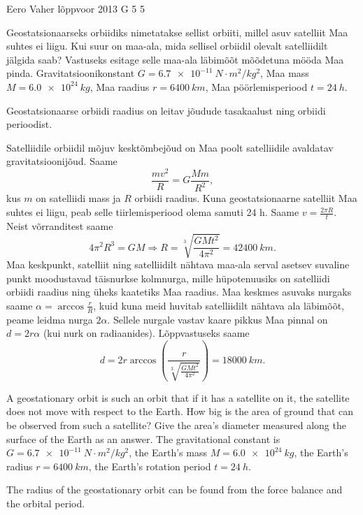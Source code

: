 {Eero Vaher} %
{lõppvoor} %
{2013} %
{G 5} %
{5} %
{
\ifStatement
Geostatsionaarseks orbiidiks nimetatakse sellist orbiiti, millel asuv satelliit
Maa suhtes ei liigu. Kui suur on maa-ala, mida sellisel orbiidil olevalt
satelliidilt jälgida saab? Vastuseks esitage selle maa-ala läbimõõt mõõdetuna
mööda Maa pinda. Gravitatsioonikonstant $G=\SI{6.7e-11}{N \cdot m^2/kg^2}$, Maa
mass $M=\SI{6,0e24}{kg}$, Maa raadius $r=\SI{6400}{km}$, Maa
pöörlemisperiood $t=\SI{24}{h}$.
\fi


\ifHint
Geostatsionaarse orbiidi raadius on leitav jõudude tasakaalust ning orbiidi perioodist.
\fi


\ifSolution
Satelliidile orbiidil mõjuv kesktõmbejõud on Maa poolt satelliidile avaldatav gravitatsioonijõud. Saame $$\frac{mv^2}{R}=G\frac{Mm}{R^2},$$kus $m$ on satelliidi mass ja $R$ orbiidi raadius. Kuna geostatsionaarne satelliit Maa suhtes ei liigu, peab selle tiirlemisperiood olema samuti 24 h. Saame $v=\frac{2\pi R}{t}$. Neist võrranditest saame $$4\pi^2 R^3=GM \Rightarrow R=\sqrt[3]{\frac{GMt^2}{4\pi^2}}=\SI{42400}{km}.$$ Maa keskpunkt, satelliit ning satelliidilt nähtava maa-ala serval asetsev suvaline punkt moodustavad täisnurkse kolmnurga, mille hüpotenuusiks on satelliidi orbiidi raadius ning üheks kaatetiks Maa raadius. Maa keskmes asuvaks nurgaks saame $\alpha=\arccos{\frac{r}{R}}$, kuid kuna meid huvitab satelliidilt nähtava ala läbimõõt, peame leidma nurga $2\alpha$. Sellele nurgale vastav kaare pikkus Maa pinnal on $d=2r\alpha$ (kui nurk on radiaanides). Lõppvastuseks saame 
$$d=2r\arccos \left(\frac{r}{\sqrt[3]{\frac{GMt^2}{4\pi^2}}}\right) =\SI{18000}{km}.$$
\fi


\ifEngStatement
A geostationary orbit is such an orbit that if it has a satellite on it, the satellite does not move with respect to the Earth. How big is the area of ground that can be observed from such a satellite? Give the area’s diameter measured along the surface of the Earth as an answer. The gravitational constant is $G=\SI{6.7e-11}{N \cdot m^2/kg^2}$, the Earth’s mass $M=\SI{6,0e24}{kg}$, the Earth’s radius $r=\SI{6400}{km}$, the Earth’s rotation period $t=\SI{24}{h}$.
\fi


\ifEngHint
The radius of the geostationary orbit can be found from the force balance and the orbital period.
\fi


}
